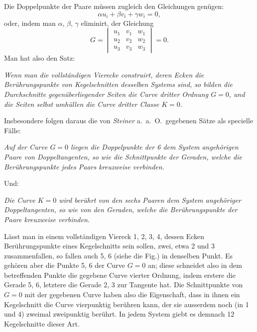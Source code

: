 \documentclass{article}
\begin{document}

Die Doppelpunkte der Paare müssen zugleich den Gleichungen genügen:
\[
\alpha u_{i}+\beta v_{i}+\gamma w_{i} = 0,
\]
oder, indem man $\alpha$, $\beta$, $\gamma$ eliminirt, der Gleichung
\[
G = \begin{vmatrix}
u_{1} & v_{1} & w_{1}\\
u_{2} & v_{2} & w_{2}\\
u_{3} & v_{3} & w_{3}
\end{vmatrix} = 0.
\]
Man hat also den Satz:

\emph{Wenn man die vollständigen Vierecke construirt, deren Ecken die Berührungspunkte von Kegelschnitten desselben Systems sind, so bilden die Durchschnitte gegenüberliegender Seiten die Curve dritter Ordnung $G=0$, und die Seiten selbst umhüllen die Curve dritter Classe $K=0$.}

Insbesondere folgen daraus die von \emph{Steiner} a.\ a.\ O.\ gegebenen Sätze als specielle Fälle:

\emph{Auf der Curve $G=0$ liegen die Doppelpunkte der 6 dem System angehörigen Paare von Doppeltangenten, so wie die Schnittpunkte der Geraden, welche die Berührungspunkte jedes Paars kreuzweise verbinden.}

Und:

\emph{Die Curve $K=0$ wird berührt von den sechs Paaren dem System angehöriger Doppeltangenten, so wie von den Geraden, welche die Berührungspunkte der Paare kreuzweise verbinden.}

Lässt man in einem vollständigen Viereck 1, 2, 3, 4, dessen Ecken Berührungspunkte eines Kegelschnitts sein sollen, zwei, etwa 2 und 3 zusammenfallen, so fallen auch 5, 6 (siehe die Fig.) in denselben Punkt. Es gehören aber die Punkte 5, 6 der Curve $G=0$ an; diese schneidet also in dem betreffenden Punkte die gegebene Curve vierter Ordnung, indem erstere die Gerade 5, 6, letztere die Gerade 2, 3 zur Tangente hat. Die Schnittpunkte von $G=0$ mit der gegebenen Curve haben also die Eigenschaft, dass in ihnen ein Kegelschnitt die Curve vierpunktig berühren kann, der sie ausserdem noch (in 1 und 4) zweimal zweipunktig berührt. In jedem System giebt es demnach 12 Kegelschnitte dieser Art.

\end{document}
